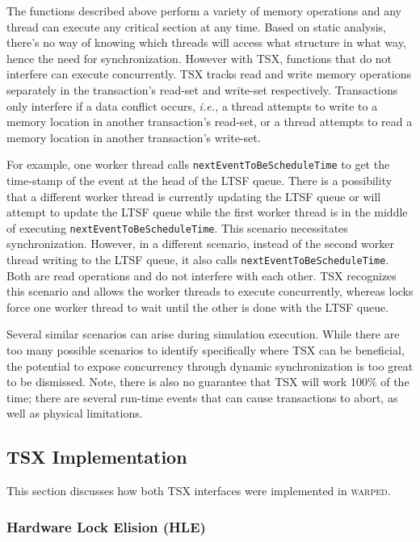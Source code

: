 \documentclass{sig-alternate}
\begin{document}
The functions described above perform a variety of memory operations and any thread can
execute any critical section at any time.  Based on static analysis, there's no way of
knowing which threads will access what structure in what way, hence the need for
synchronization.  However with TSX, functions that do not interfere can execute
concurrently.  TSX tracks read and write memory operations separately in the transaction's
read-set and write-set respectively.  Transactions only interfere if a data conflict
occurs, \emph{i.e.,} a thread attempts to write to a memory location in another
transaction's read-set, or a thread attempts to read a memory location in another
transaction's write-set.

For example, one worker thread calls \texttt{nextEventToBeScheduleTime} to get the
time-stamp of the event at the head of the LTSF queue.  There is a possibility that a
different worker thread is currently updating the LTSF queue or will attempt to update the
LTSF queue while the first worker thread is in the middle of executing
\texttt{nextEventToBeScheduleTime}.  This scenario necessitates synchronization.  However,
in a different scenario, instead of the second worker thread writing to the LTSF queue, it
also calls \texttt{nextEventToBeScheduleTime}.  Both are read operations and do not
interfere with each other.  TSX recognizes this scenario and allows the worker threads to
execute concurrently, whereas locks force one worker thread to wait until the other is
done with the LTSF queue.

Several similar scenarios can arise during simulation execution.  While there are too many
possible scenarios to identify specifically where TSX can be beneficial, the potential to
expose concurrency through dynamic synchronization is too great to be dismissed.  Note,
there is also no guarantee that TSX will work 100\% of the time; there are several
run-time events that can cause transactions to abort, as well as physical limitations.

\subsection{TSX Implementation}

This section discusses how both TSX interfaces were implemented in \textsc{warped}.

\subsubsection{Hardware Lock Elision (HLE)}
\end{document}
